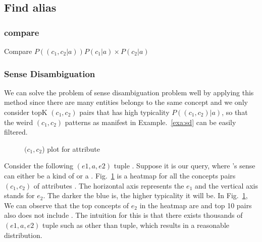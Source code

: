 \begin{table*}[htbp!]
\begin{tabular}{llrrlrr}
    \end{tabular}%
  \label{tab:rerank}%
\end{table*}%



\subsection{Find alias}
\subsubsection{compare}

Compare $ P((c_1,c_2 |a ))P(c_1|a) \times P(c_2|a)$




\subsubsection{Sense Disambiguation}

We can solve the problem of sense disambiguation problem well by applying this method since there are many entities belongs to the same concept and we only consider topK $(c_1,c_2)$ pairs that has high typicality $P( (c_1,c_2) |a)$, so that the weird $(c_1,c_2)$ patterns as manifest in Example.~\ref{exa:sd} can be easily filtered.

\begin{figure}[!htb]
\centering {}
\caption{$(c_1,c_2$) plot for attribute } \label{fig:evplot}
\end{figure}

\begin{example}
Consider the following $(e1,a,e2)$ tuple . Suppose it is our query, where 's sense can either be a kind of  or a .
Fig.~\ref{fig:evplot} is a heatmap for all the concepts pairs $(c_1,c_2)$ of attributes . The horizontal axis represents the $e_1$ and the vertical axis stands for $e_2$. The darker the blue is, the higher typicality it will be. In Fig.~\ref{fig:evplot}, We can observe that the top concepts of $e_2$ in the heatmap are  and top 10 pairs also does not include . The intuition for this is that there exists thousands of $(e1,a,e2)$ tuple such as  other than  tuple, which results in a reasonable distribution.
\label{exa:sd}
\end{example}





